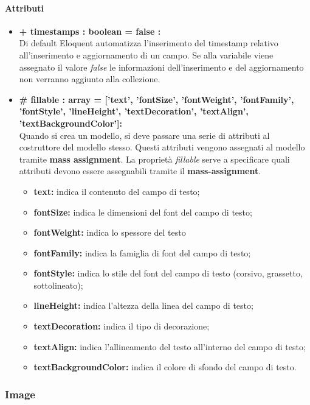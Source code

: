 	\paragraph{Attributi}
	\begin{itemize}
		\item \textbf{+ timestamps : boolean = false :}\\
		Di default Eloquent automatizza l'inserimento del timestamp relativo all'inserimento e aggiornamento di un campo. Se alla variabile viene assegnato il valore \textit{false} le informazioni dell'inserimento e del aggiornamento non verranno aggiunto alla collezione.
		\item \textbf{\# fillable : array = [’text’, ’fontSize’, ’fontWeight’, ’fontFamily’, ’fontStyle’, ’lineHeight’, ’textDecoration’, ’textAlign’, ’textBackgroundColor']:}\\
		Quando si crea un modello, si deve passare una serie di attributi al costruttore del modello stesso. Questi attributi vengono assegnati al modello tramite \textbf{mass assignment}. La proprietà \textit{fillable} serve a specificare quali attributi devono essere assegnabili tramite il \textbf{mass-assignment}.
		\begin{itemize}
			\item \textbf{text:} indica il contenuto del campo di testo;
			\item \textbf{fontSize:} indica le dimensioni del font del campo di testo;
			\item \textbf{fontWeight:} indica lo spessore del testo
			\item \textbf{fontFamily:} indica la famiglia di font del campo di testo;
			\item \textbf{fontStyle:} indica lo stile del font del campo di testo (corsivo, grassetto, sottolineato);
			\item \textbf{lineHeight:} indica l'altezza della linea del campo di testo;
			\item \textbf{textDecoration:} indica il tipo di decorazione;
			\item \textbf{textAlign:} indica l'allineamento del testo all'interno del campo di testo;
			\item \textbf{textBackgroundColor:} indica il colore di sfondo del campo di testo.
		\end{itemize}
	\end{itemize}
\newpage


\subsubsection{Image}

